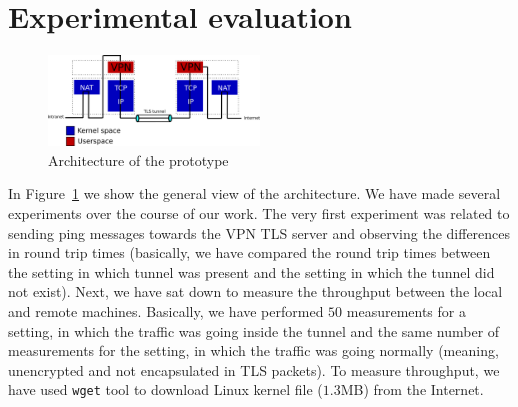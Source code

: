 \section{Experimental evaluation}
\label{section:experiments}



\begin{figure}[!h]
        \includegraphics[width=0.5\textwidth]{graphics/architecture.png}
        \caption{Architecture of the prototype}
        \label{fig:arch}
\end{figure}



In Figure~\ref{fig:arch} we show the general view of the architecture. 
We have made several experiments over the course of our work. The very first experiment was 
related to sending ping messages towards the VPN TLS server and observing the differences in
round trip times (basically, we have compared the round trip times between the setting in 
which tunnel was present and the setting in which the tunnel did not exist). Next, we have
sat down to measure the throughput between the local and remote machines. Basically, we have 
performed $50$ measurements for a setting, in which the traffic was going inside the tunnel
and the same number of measurements for the setting, in which the traffic was going 
normally (meaning, unencrypted and not encapsulated in TLS packets). To measure throughput,
we have used \texttt{wget} tool to download Linux kernel file ($1.3$MB) from the Internet.

